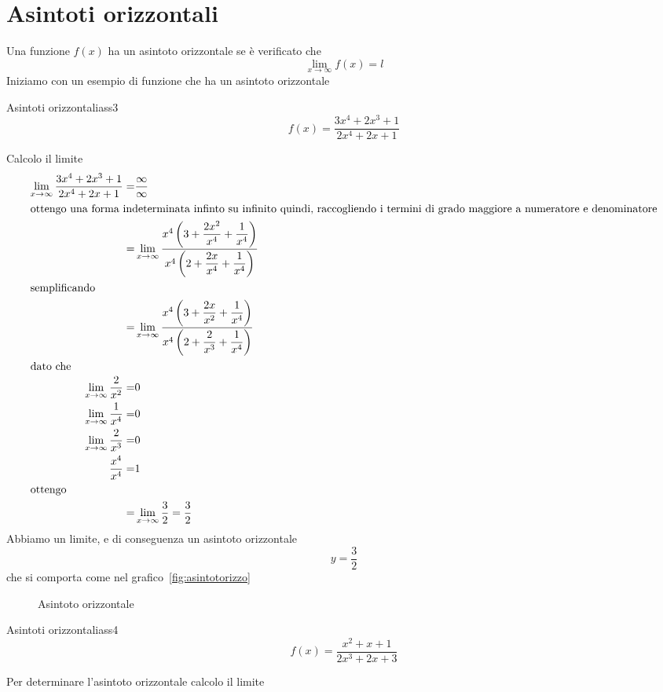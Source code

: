 \section{Asintoti orizzontali}
Una funzione $f(x)$ ha un asintoto orizzontale se è verificato che \[\lim_{x\to \infty}f(x)=l \]
Iniziamo con un esempio di funzione che ha un asintoto orizzontale
\begin{esempiot}{Asintoti orizzontali}{ass3}
	\[f(x)=\dfrac{3x^4+2x^3+1}{2x^4+2x+1}\]
\end{esempiot}
Calcolo il limite
\begin{align*}\index{Forma!indeterminata!infinito su infinito}
\lim_{x\to \infty}\dfrac{3x^4+2x^3+1}{2x^4+2x+1}=&\dfrac{\infty}{\infty}\\
\intertext{ottengo una forma indeterminata infinto su infinito quindi, raccogliendo i termini di grado maggiore a numeratore e denominatore}
=&\lim_{x\to \infty}\dfrac{x^4\left(3+\dfrac{2x^2}{x^4}+\dfrac{1}{x^4}\right)}{x^4\left(2+\dfrac{2x}{x^4}+\dfrac{1}{x^4}\right)}\\
\intertext{semplificando}
=&\lim_{x\to \infty}\dfrac{x^4\left(3+\dfrac{2x}{x^2}+\dfrac{1}{x^4}\right)}{x^4\left(2+\dfrac{2}{x^3}+\dfrac{1}{x^4}\right)}\\
\intertext{dato che}
\lim_{x\to \infty}\dfrac{2}{x^2}=&0\\
\lim_{x\to \infty}\dfrac{1}{x^4}=&0\\
\lim_{x\to \infty}\dfrac{2}{x^3}=&0\\
\dfrac{x^4}{x^4}=&1\\
\intertext{ottengo}
=&\lim_{x\to \infty}\dfrac{3}{2}=\dfrac{3}{2}\\
\end{align*}
Abbiamo un limite, e di conseguenza un asintoto orizzontale\[y=\dfrac{3}{2}\]  che si comporta come nel grafico~\vref{fig:asintotorizzo}
\begin{figure}
	\centering
	
	\captionsetup{format=grafico}
	\caption[Asintoto orizzontale]{Asintoto orizzontale}
	\label{fig:asintotorizzo}
\end{figure}
\begin{esempiot}{Asintoti orizzontali}{ass4}
	\[f(x)=\dfrac{x^2+x+1}{2x^3+2x+3}\]
\end{esempiot}
Per determinare l'asintoto orizzontale calcolo il limite 
